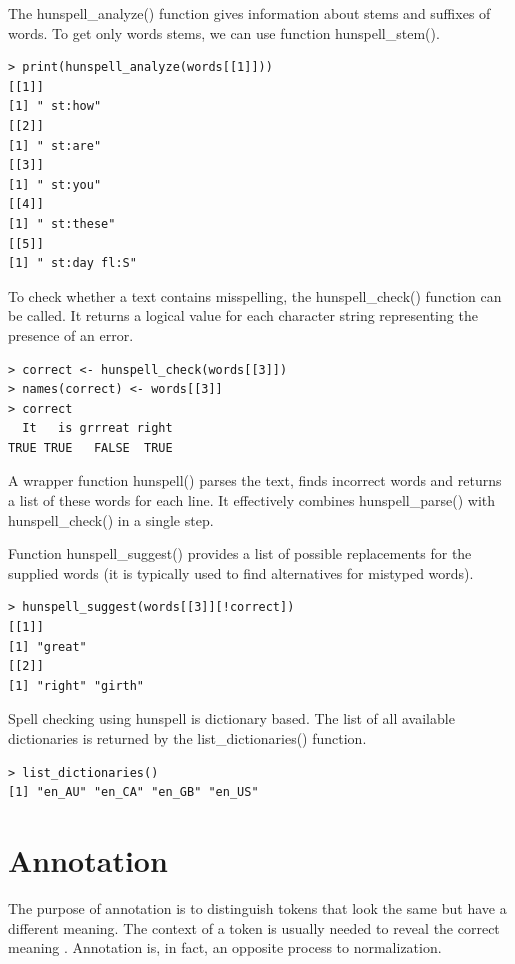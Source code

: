 \documentclass[11pt,openany,executivepaper]{book}
\begin{document}
The hunspell\_analyze() function gives information about stems and suffixes of words. To get only words stems, we can use function hunspell\_stem().

\begin{verbatim}
> print(hunspell_analyze(words[[1]]))
[[1]]
[1] " st:how"
[[2]]
[1] " st:are"
[[3]]
[1] " st:you"
[[4]]
[1] " st:these"
[[5]]
[1] " st:day fl:S"
\end{verbatim}

To check whether a text contains misspelling, the hunspell\_check() function can be called. It returns a logical value for each character string representing the presence of an error.

\begin{verbatim}
> correct <- hunspell_check(words[[3]])
> names(correct) <- words[[3]]
> correct
  It   is grrreat right
TRUE TRUE   FALSE  TRUE
\end{verbatim}

A wrapper function hunspell() parses the text, finds incorrect words and returns a list of these words for each line. It effectively combines hun\-sp\-ell\_parse() with hun\-spell\_check() in a single step.

Function hunspell\_suggest() provides a list of possible replacements for the supplied words (it is typically used to find alternatives for mistyped words).

\begin{verbatim}
> hunspell_suggest(words[[3]][!correct])
[[1]]
[1] "great"
[[2]]
[1] "right" "girth"
\end{verbatim}

Spell checking using hunspell is dictionary based. The list of all available dictionaries is returned by the list\_dictionaries() function.

\begin{verbatim}
> list_dictionaries()
[1] "en_AU" "en_CA" "en_GB" "en_US"
\end{verbatim}

\section{Annotation}
The purpose of annotation is to distinguish tokens that look the same but have a different meaning. The context of a token is usually needed to reveal the correct meaning \cite{263}. Annotation is, in fact, an opposite process to normalization.
\end{document}
